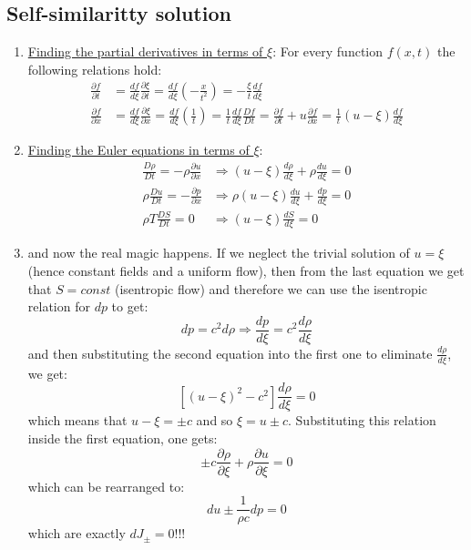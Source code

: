 ﻿\documentclass[11pt]{article}
\begin{document}
\subsection{Self-similaritty solution}
\begin{enumerate}
  \item \underline{Finding the partial derivatives in terms of $\xi$}:
  For every function $f(x,t)$ the following relations hold:
  \begin{align}
    \frac{\partial f}{\partial t} &= \frac{df}{d\xi} \frac{\partial \xi}{\partial t} = \frac{df}{d\xi} \left( -\frac{x}{t^2} \right) = -\frac{\xi}{t} \frac{df}{d\xi} \\
    \frac{\partial f}{\partial x} &= \frac{df}{d\xi} \frac{\partial \xi}{\partial x} = \frac{df}{d\xi} \left( \frac{1}{t} \right) = \frac{1}{t} \frac{df}{d\xi}
    \frac{Df}{Dt} = \frac{\partial f}{\partial t} + u \frac{\partial f}{\partial x} = \frac{1}{t} (u - \xi) \frac{df}{d\xi}
  \end{align}
  \item \underline{Finding the Euler equations in terms of $\xi$}:
  \begin{align}
    \frac{D\rho}{Dt}=-\rho \frac{\partial u}{\partial x} &\Rightarrow (u - \xi) \frac{d\rho}{d\xi} + \rho \frac{du}{d\xi} = 0 \\
    \rho \frac{Du}{Dt} = -\frac{\partial p}{\partial x} &\Rightarrow \rho (u - \xi) \frac{du}{d\xi} + \frac{dp}{d\xi} = 0 \\
    \rho T \frac{DS}{Dt} = 0 &\Rightarrow (u - \xi) \frac{dS}{d\xi} = 0
  \end{align}
  \item and now the real magic happens. If we neglect the trivial solution of $u=\xi$ (hence constant fields and a uniform flow), then from the last equation we get that $S=const$ (isentropic flow) and therefore we can use the isentropic relation for $dp$ to get:
  \begin{equation}
    dp = c^2 d\rho \Rightarrow \frac{dp}{d\xi} = c^2 \frac{d\rho}{d\xi}
  \end{equation}
  and then substituting the second equation into the first one to eliminate $\frac{d\rho}{d\xi}$, we get:
  \begin{equation}
    \left[ (u - \xi)^2 - c^2 \right] \frac{d\rho}{d\xi} = 0
  \end{equation}
  which means that $u-\xi = \pm c$ and so $\xi = u \pm c$.
  Substituting this relation inside the first equation, one gets:
  \begin{equation}
    \pm c \frac{\partial \rho}{\partial \xi} + \rho \frac{\partial u}{\partial \xi} = 0
  \end{equation}
  which can be rearranged to:
  \begin{equation}
    du \pm \frac{1}{\rho c} dp = 0
  \end{equation}
  which are exactly $dJ_{\pm} = 0$!!! 
\end{enumerate}
\end{document}
